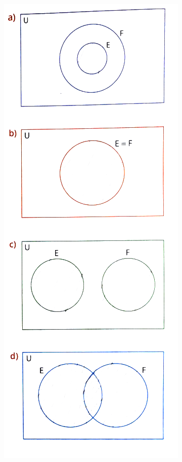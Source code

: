 \documentclass[a4paper,14pt]{article}
\begin{document}
\begin{multicols}{2}
\begin{enumerate}
    			\includegraphics[width=1.1\linewidth]{6FMA52_imagens/imagem1} \columnbreak

\end{enumerate}
\end{multicols}
\end{document}
